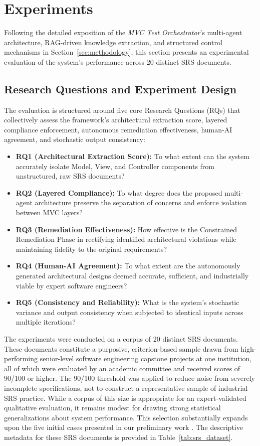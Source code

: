 \section{Experiments}
\label{sec:experiment}

Following the detailed exposition of the \textit{MVC Test Orchestrator}'s multi-agent architecture, RAG-driven knowledge extraction, and structured control mechanisms in Section~\ref{sec:methodology}, this section presents an experimental evaluation of the system's performance across 20 distinct SRS documents.

\subsection{Research Questions and Experiment Design}

The evaluation is structured around five core Research Questions (RQs) that collectively assess the framework's architectural extraction score, layered compliance enforcement, autonomous remediation effectiveness, human-AI agreement, and stochastic output consistency:

\begin{itemize}
    \item \textbf{RQ1 (Architectural Extraction Score):} To what extent can the system accurately isolate Model, View, and Controller components from unstructured, raw SRS documents?
    \item \textbf{RQ2 (Layered Compliance):} To what degree does the proposed multi-agent architecture preserve the separation of concerns and enforce isolation between MVC layers?
    \item \textbf{RQ3 (Remediation Effectiveness):} How effective is the Constrained Remediation Phase in rectifying identified architectural violations while maintaining fidelity to the original requirements?
    \item \textbf{RQ4 (Human-AI Agreement):} To what extent are the autonomously generated architectural designs deemed accurate, sufficient, and industrially viable by expert software engineers?
    \item \textbf{RQ5 (Consistency and Reliability):} What is the system's stochastic variance and output consistency when subjected to identical inputs across multiple iterations?
\end{itemize}

The experiments were conducted on a corpus of 20 distinct SRS documents. These documents constitute a purposive, criterion-based sample drawn from high-performing senior-level software engineering capstone projects at one institution, all of which were evaluated by an academic committee and received scores of 90/100 or higher. The 90/100 threshold was applied to reduce noise from severely incomplete specifications, not to construct a representative sample of industrial SRS practice. While a corpus of this size is appropriate for an expert-validated qualitative evaluation, it remains modest for drawing strong statistical generalizations about system performance. This selection substantially expands upon the five initial cases presented in our preliminary work \citep{dim2026mvc}. The descriptive metadata for these SRS documents is provided
in Table~\ref{tab:srs_dataset}.

